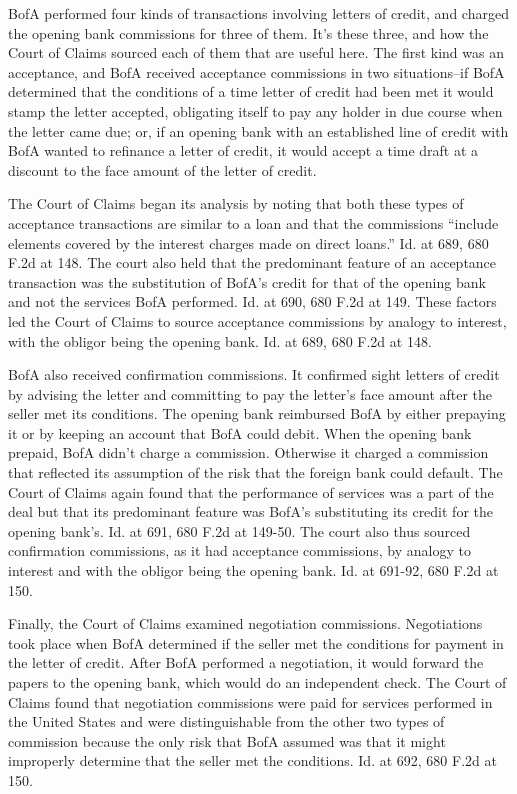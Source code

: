 \begin{select}
BofA performed four kinds of transactions involving letters of credit, and charged the opening bank commissions for three of them. It's these three, and how the Court of Claims sourced each of them that are useful here. The first kind was an acceptance, and BofA received acceptance commissions in two situations--if BofA determined that the conditions of a time letter of credit had been met it would stamp the letter accepted, obligating itself to pay any holder in due course when the letter came due; or, if an opening bank with an established line of credit with BofA wanted to refinance a letter of credit, it would accept a time draft at a discount to the face amount of the letter of credit.

The Court of Claims began its analysis by noting that both these types of acceptance transactions are similar to a loan and that the commissions ``include elements covered by the interest charges made on direct loans.'' Id. at 689, 680 F.2d at 148. The court also held that the predominant feature of an acceptance transaction was the substitution of BofA's credit for that of the opening bank and not the services BofA performed. Id. at 690, 680 F.2d at 149. These factors led the  Court of Claims to source acceptance commissions by analogy to interest, with the obligor being the opening bank. Id. at 689, 680 F.2d at 148.

BofA also received confirmation commissions. It confirmed sight letters of credit by advising the letter and committing to pay the letter's face amount after the seller met its conditions. The opening bank reimbursed BofA by either prepaying it or by keeping an account that BofA could debit. When the opening bank prepaid, BofA didn't charge a commission. Otherwise it charged a commission that reflected its assumption of the risk that the foreign bank could default. The Court of Claims again found that the performance of services was a part of the deal but that its predominant feature was BofA's substituting its credit for the opening bank's. Id. at 691, 680 F.2d at 149-50. The court also thus sourced confirmation commissions, as it had acceptance commissions, by analogy to interest and with the obligor being the opening bank. Id. at 691-92, 680 F.2d at 150.

Finally, the Court of Claims examined negotiation commissions. Negotiations took place when BofA determined if the seller met the conditions for payment in the letter of credit. After BofA performed a negotiation, it would forward the papers to the opening  bank, which would do an independent check. The Court of Claims found that negotiation commissions were paid for services performed in the United States and were distinguishable from the other two types of commission because the only risk that BofA assumed was that it might improperly determine that the seller met the conditions. Id. at 692, 680 F.2d at 150.


\end{select}
